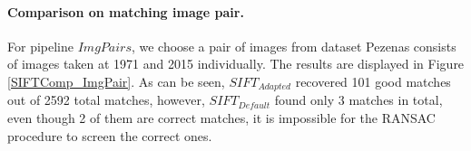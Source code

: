 \paragraph{Comparison on matching image pair.}
For pipeline ${ImgPairs}$, we choose a pair of images from dataset Pezenas consists of images taken at 1971 and 2015 individually. The results are displayed in Figure \ref{SIFTComp_ImgPair}. As can be seen, $SIFT_{Adapted}$ recovered 101 good matches out of 2592 total matches, however, $SIFT_{Default}$ found only 3 matches in total, even though 2 of them are correct matches, it is impossible for the RANSAC procedure to screen the correct ones.\\
\begin{figure}[htbp]
	\scriptsize 
	\begin{center}
\end{center}
\end{figure}

